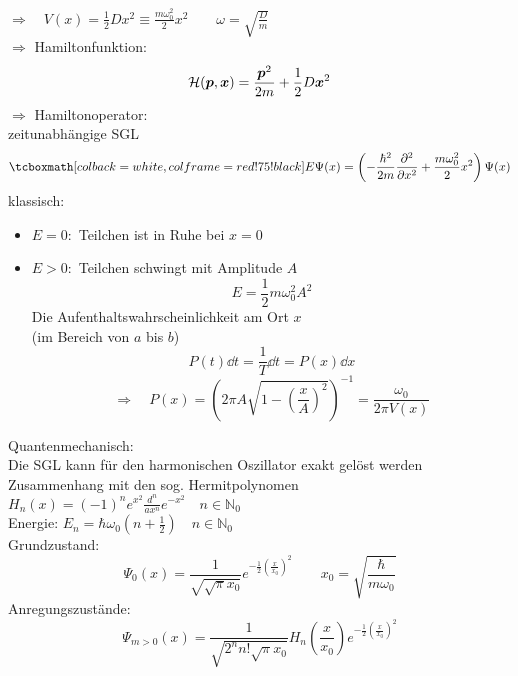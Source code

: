 $ \Rightarrow \quad V(x) = \frac{1}{2} D x^2 \equiv \frac{m \omega_0^2}{2} x^2 \qquad \omega = \sqrt{\frac{D}{m}} $\\
$ \Rightarrow $ Hamiltonfunktion:
$$ \mathcal{H}(\bm{p}, \bm{x}) = \frac{\bm{p}^2}{2m} + \frac{1}{2} D \bm{x}^2 $$
$ \Rightarrow $ Hamiltonoperator:\\
zeitunabhängige SGL
\begin{equation*}
\rmbox{ E \Psi(x) = \left(-\frac{\hbar^2}{2m} \prt{^2}{x^2} + \frac{m \omega_0^2}{2} x^2\right) \Psi(x) }
\end{equation*}
klassisch:
\begin{itemize}
	\item $ E = 0 : $ Teilchen ist in Ruhe bei $ x = 0 $
	\item $ E > 0 : $ Teilchen schwingt mit Amplitude $ A $
	\begin{equation*}
	E = \frac{1}{2} m \omega_0^2 A^2
	\end{equation*}
	Die Aufenthaltswahrscheinlichkeit am Ort $ x $\\
	(im Bereich von $ a $ bis $ b $)
	\begin{equation*}
	P(t) \dd t = \frac{1}{T} \dd t = P(x) \dd x
	\end{equation*}
	\begin{equation*}
	\Rightarrow \quad P(x) = \left(2 \pi A \sqrt{1 - \left(\frac{x}{A}\right)^2}\right)^{-1} = \frac{\omega_0}{2 \pi V(x)}
	\end{equation*}
\end{itemize}
Quantenmechanisch:\\[5pt]
Die SGL kann für den harmonischen Oszillator exakt gelöst werden\\
Zusammenhang mit den sog. Hermitpolynomen $ H_{n}(x) = (-1)^n e^{x^2} \frac{d^n}{a x^n} e^{-x^2} \quad n \in \mathbb{N}_0 $\\[5pt]
Energie: $ E_n = \hbar \omega_0 (n + \frac{1}{2}) \quad n \in \mathbb{N}_0 $\\
Grundzustand:
$$ \Psi_0(x) = \frac{1}{\sqrt{\sqrt{\pi} x_0}} e^{-\frac{1}{2} \left(\frac{x}{x_0}\right)^2} \qquad x_0 = \sqrt{\frac{\hbar}{m \omega_0}} $$
Anregungszustände:
\begin{equation*}
\Psi_{m > 0} (x) = \frac{1}{\sqrt{2^n n! \sqrt{\pi} x_0}} H_n \left(\frac{x}{x_0}\right) e^{-\frac{1}{2} \left(\frac{x}{x_0}\right)^2}
\end{equation*}
